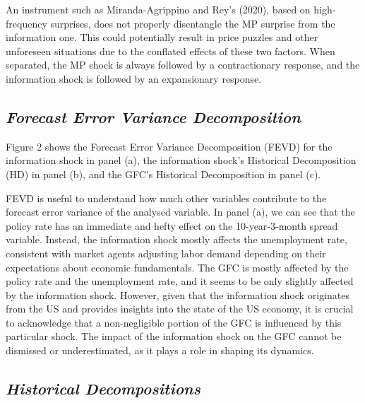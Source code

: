 \documentclass[11pt,a4paper]{article}
\begin{document}
An instrument such as Miranda-Agrippino and Rey's (2020), based on high-frequency surprises, does not properly disentangle the MP surprise from the information one. This could potentially result in price puzzles and other unforeseen situations due to the conflated effects of these two factors. When separated, the MP shock is always followed by a contractionary response, and the information shock is followed by an expansionary response.
    
\subsection{\textit{Forecast Error Variance Decomposition}}
Figure 2 shows the Forecast Error Variance Decomposition (FEVD) for the information shock in panel (a), the information shock's Historical Decomposition (HD) in panel (b), and the GFC's Historical Decomposition in panel (c).

FEVD is useful to understand how much other variables contribute to the forecast error variance of the analysed variable. 
In panel (a), we can see that the policy rate has an immediate and hefty effect on the 10-year-3-month spread variable. Instead, the information shock mostly affects the unemployment rate, consistent with market agents adjusting labor demand depending on their expectations about economic fundamentals.
The GFC is mostly affected by the policy rate and the unemployment rate, and it seems to be only slightly affected by the information shock. 
However, given that the information shock originates from the US and provides insights into the state of the US economy, it is crucial to acknowledge that a non-negligible portion of the GFC is influenced by this particular shock. The impact of the information shock on the GFC cannot be dismissed or underestimated, as it plays a role in shaping its dynamics.

\subsection{\textit{Historical Decompositions}}
\end{document}

